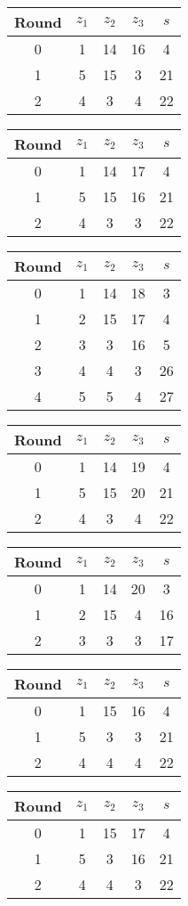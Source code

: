 \begin{tabular}{c | c | c | c | c }
Round & $z_1$ & $z_2$ & $z_3$ & $s$ \\
\hline
0 & 1 & 14 & 16 & 4 \\
1 & 5 & 15 & 3 & 21 \\
2 & 4 & 3 & 4 & 22
\end{tabular}

\begin{tabular}{c | c | c | c | c }
Round & $z_1$ & $z_2$ & $z_3$ & $s$ \\
\hline
0 & 1 & 14 & 17 & 4 \\
1 & 5 & 15 & 16 & 21 \\
2 & 4 & 3 & 3 & 22
\end{tabular}

\begin{tabular}{c | c | c | c | c }
Round & $z_1$ & $z_2$ & $z_3$ & $s$ \\
\hline
0 & 1 & 14 & 18 & 3 \\
1 & 2 & 15 & 17 & 4 \\
2 & 3 & 3 & 16 & 5 \\
3 & 4 & 4 & 3 & 26 \\
4 & 5 & 5 & 4 & 27
\end{tabular}

\begin{tabular}{c | c | c | c | c }
Round & $z_1$ & $z_2$ & $z_3$ & $s$ \\
\hline
0 & 1 & 14 & 19 & 4 \\
1 & 5 & 15 & 20 & 21 \\
2 & 4 & 3 & 4 & 22
\end{tabular}

\begin{tabular}{c | c | c | c | c }
Round & $z_1$ & $z_2$ & $z_3$ & $s$ \\
\hline
0 & 1 & 14 & 20 & 3 \\
1 & 2 & 15 & 4 & 16 \\
2 & 3 & 3 & 3 & 17
\end{tabular}

\begin{tabular}{c | c | c | c | c }
Round & $z_1$ & $z_2$ & $z_3$ & $s$ \\
\hline
0 & 1 & 15 & 16 & 4 \\
1 & 5 & 3 & 3 & 21 \\
2 & 4 & 4 & 4 & 22
\end{tabular}

\begin{tabular}{c | c | c | c | c }
Round & $z_1$ & $z_2$ & $z_3$ & $s$ \\
\hline
0 & 1 & 15 & 17 & 4 \\
1 & 5 & 3 & 16 & 21 \\
2 & 4 & 4 & 3 & 22
\end{tabular}

